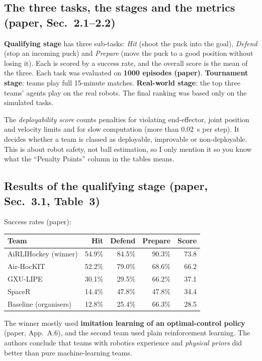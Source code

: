 \documentclass[11pt,a4paper]{article}
\begin{document}
\subsection{The three tasks, the stages and the metrics (paper, Sec.~2.1--2.2)}
\textbf{Qualifying stage} has three sub-tasks: \emph{Hit} (shoot the puck into the goal),
\emph{Defend} (stop an incoming puck) and \emph{Prepare} (move the puck to a good position
without losing it). Each is scored by a success rate, and the overall score is the mean of the
three. Each task was evaluated on \textbf{1000 episodes} \textbf{(paper)}. \textbf{Tournament
stage}: teams play full 15-minute matches. \textbf{Real-world stage}: the top three teams'
agents play on the real robots. The final ranking was based only on the simulated tasks.

The \emph{deployability score} counts penalties for violating end-effector, joint position and
velocity limits and for slow computation (more than $0.02$~s per step). It decides whether a team
is classed as deployable, improvable or non-deployable. This is about robot safety, not ball
estimation, so I only mention it so you know what the ``Penalty Points'' column in the tables
means.

\subsection{Results of the qualifying stage (paper, Sec.~3.1, Table~3)}
Success rates (paper):

\begin{center}
\small
\begin{tabular}{@{}lrrrr@{}}
\toprule
Team & Hit & Defend & Prepare & Score \\
\midrule
AiRLIHockey (winner) & 54.9\% & 84.5\% & 90.3\% & 73.8 \\
Air-HocKIT & 52.2\% & 79.0\% & 68.6\% & 66.2 \\
GXU-LIPE & 30.1\% & 29.5\% & 66.2\% & 37.1 \\
SpaceR & 14.4\% & 47.8\% & 47.8\% & 34.4 \\
Baseline (organisers) & 12.8\% & 25.4\% & 66.3\% & 28.5 \\
\bottomrule
\end{tabular}
\end{center}
The winner mostly used \textbf{imitation learning of an optimal-control policy} (paper, App.~A.6),
and the second team used plain reinforcement learning. The authors conclude that teams with
robotics experience and \emph{physical priors} did better than pure machine-learning teams.
\end{document}
